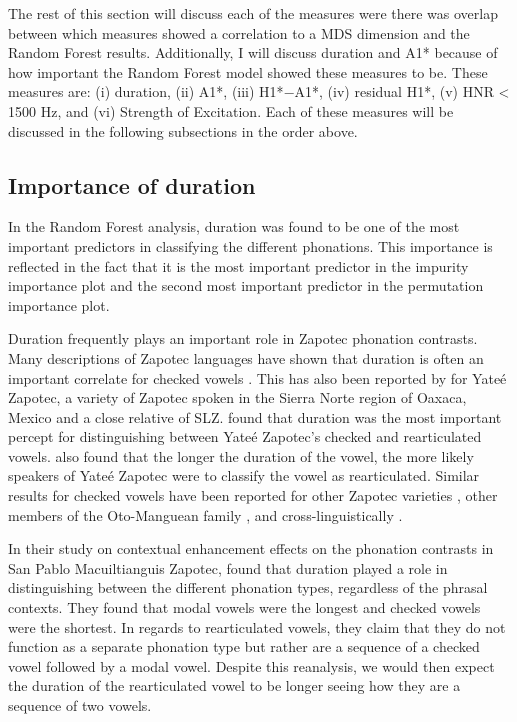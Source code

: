 The rest of this section will discuss each of the measures were there was overlap between which measures showed a correlation to a MDS dimension and the Random Forest results. Additionally, I will discuss duration and A1* because of how important the Random Forest model showed these measures to be. These measures are: (i) duration, (ii) A1*, (iii) H1*$-$A1*, (iv)  residual H1*, (v) HNR < 1500 Hz, and (vi) Strength of Excitation. Each of these measures will be discussed in the following subsections in the order above.

\subsection{Importance of duration} \label{sec:duration_discussion}
In the Random Forest analysis, duration was found to be one of the most important predictors in classifying the different phonations. This importance is reflected in the fact that it is the most important predictor in the impurity importance plot and the second most important predictor in the permutation importance plot. 

Duration frequently plays an important role in Zapotec phonation contrasts. Many descriptions of Zapotec languages have shown that duration is often an important correlate for checked vowels \citep{ariza-garciaPhonationTypesTones2018}. This has also been reported by \citet{chaiPerceptionCheckedRearticulated2025} for Yateé Zapotec, a variety of Zapotec spoken in the Sierra Norte region of Oaxaca, Mexico and a close relative of SLZ. \citet{chaiPerceptionCheckedRearticulated2025} found that duration was the most important percept for distinguishing between Yateé Zapotec's checked and rearticulated vowels. \citeauthor{chaiPerceptionCheckedRearticulated2025} also found that the longer the duration of the vowel, the more likely speakers of Yateé Zapotec were to classify the vowel as rearticulated. Similar results for checked vowels have been reported for other Zapotec varieties \citep{arellanesarellanesSistemaFonologicoPropiedades2009,arellanesarellanesDosGradosLaringizacion2010,chavez-peonInteractionMetricalStructure2010,lopeznicolasEstudiosFonologiaGramatica2016,merrillTilquiapanZapotec2008}, other members of the Oto-Manguean family \citep[e.g.,][]{campbellAspectsPhonologyMorphology2014}, and cross-linguistically \citep{gaoPhonationVariationFunction2022,chaiCheckedSyllablesChecked2022}. 

In their study on contextual enhancement effects on the phonation contrasts in San Pablo Macuiltianguis Zapotec, \citet{barzilaiContextdependentPhoneticEnhancement2021} found that duration played a role in distinguishing between the different phonation types, regardless of the phrasal contexts. They found that modal vowels were the longest and checked vowels were the shortest. In regards to rearticulated vowels, they claim that they do not function as a separate phonation type but rather are a sequence of a checked vowel followed by a modal vowel. Despite this reanalysis, we would then expect the duration of the rearticulated vowel to be longer seeing how they are a sequence of two vowels. 

